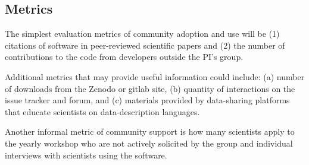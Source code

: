 \subsection{Metrics}
The simplest evaluation metrics of community adoption and use will be (1) citations of software in peer-reviewed scientific papers and (2) the number of contributions to the code from developers outside the PI's group.

Additional metrics that may provide useful information could include: (a) number of downloads from the Zenodo or gitlab site, (b) quantity of interactions on the issue tracker and forum, and (c) materials provided by data-sharing platforms that educate scientists on data-description languages.

Another informal metric of community support is how many scientists apply to the yearly workshop who are not actively solicited by the group and individual interviews with scientists using the software.


